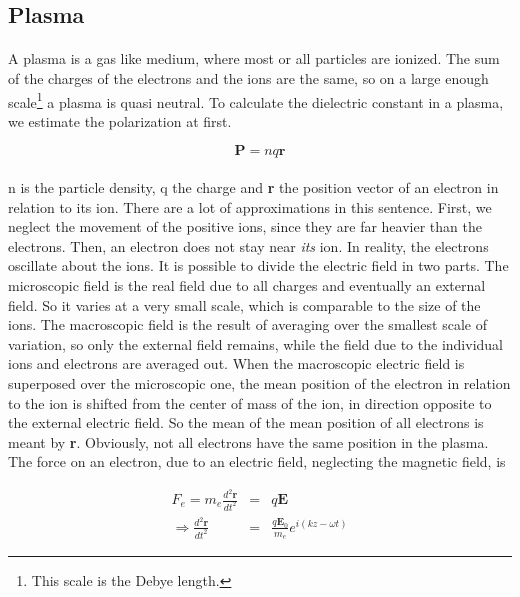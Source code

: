 \documentclass[a4paper,10pt]{thesis}
\begin{document}
\subsection{Plasma}
\paragraph*{}
A plasma is a gas like medium, where most or all particles are ionized. The sum of the charges of the electrons and the ions are the same, so on a large enough scale\footnote{This scale is the Debye length.} a plasma is quasi neutral. To calculate the dielectric constant in a plasma, we estimate the polarization at first.

\begin{equation}\label{polarization}
    \mathbf{P}=nq\mathbf{r}
\end{equation}

\paragraph*{}
n is the particle density, q the charge and \textbf{r} the position vector of an electron in relation to its ion. There are a lot of approximations in this sentence. First, we neglect the movement of the positive ions, since they are far heavier than the electrons. Then, an electron does not stay near \emph{its} ion. In reality, the electrons oscillate about the ions. It is possible to divide the electric field in two parts. The microscopic field is the real field due to all charges and eventually an external field. So it varies at a very small scale, which is comparable to the size of the ions. The macroscopic field is the result of averaging over the smallest scale of variation, so only the external field remains, while the field due to the individual ions and electrons are averaged out. When the macroscopic electric field is superposed over the microscopic one, the mean position of the electron in relation to the ion is shifted from the center of mass of the ion, in direction opposite to the external electric field. So the mean of the mean position of all electrons is meant by \textbf{r}. Obviously, not all electrons have the same position in the plasma. The force on an electron, due to an electric field, neglecting the magnetic field, is

\begin{eqnarray}
    F_e=m_e\frac{d^2\mathbf{r}}{dt^2}&=&q\mathbf{E}\label{force_on e} \\
    \Rightarrow \frac{d^2\mathbf{r}}{dt^2}&=&\frac{q \mathbf{E}_0}{m_e} e^{i(kz-\omega t)}
\end{eqnarray}
\end{document}
